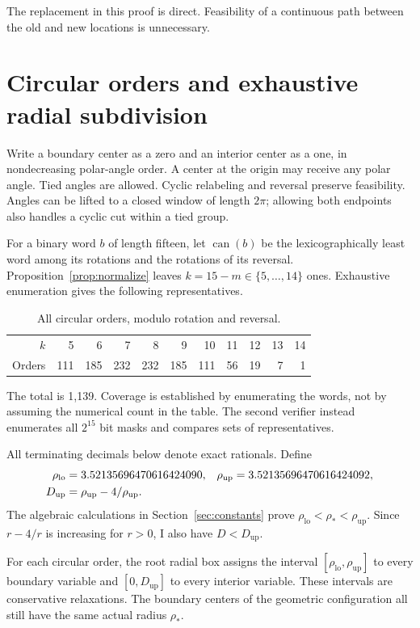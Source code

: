 \documentclass[11pt]{amsart}
\theoremstyle{definition}
\theoremstyle{remark}
\numberwithin{equation}{section}
\newcommand{\rhoopt}{\rho_*}
\newcommand{\rhol}{\rho_{\mathrm{lo}}}
\newcommand{\rhou}{\rho_{\mathrm{up}}}
\begin{document}
The replacement in this proof is direct. Feasibility of a continuous path
between the old and new locations is unnecessary.

\section{Circular orders and exhaustive radial subdivision}

Write a boundary center as a zero and an interior center as a one, in
nondecreasing polar-angle order. A center at the origin may receive any
polar angle. Tied angles are allowed. Cyclic relabeling and reversal preserve
feasibility. Angles can be lifted to a closed window of length $2\pi$;
allowing both endpoints also handles a cyclic cut within a tied group.

For a binary word $b$ of length fifteen, let $\operatorname{can}(b)$ be the
lexicographically least word among its rotations and the rotations of its
reversal. Proposition~\ref{prop:normalize} leaves $k=15-m\in\{5,\ldots,14\}$
ones. Exhaustive enumeration gives the following representatives.
\begin{table}[ht]
\centering
\caption{All circular orders, modulo rotation and reversal.}
\begin{tabular}{@{}rrrrrrrrrrr@{}}
\toprule
$k$&5&6&7&8&9&10&11&12&13&14\\
Orders&111&185&232&232&185&111&56&19&7&1\\
\bottomrule
\end{tabular}
\label{tab:orders}
\end{table}
The total is 1,139. Coverage is established by enumerating the words, not
by assuming the numerical count in the table. The second verifier instead
enumerates all $2^{15}$ bit masks and compares sets of representatives.

All terminating decimals below denote exact rationals. Define
\begin{align}\label{eq:intervals}
 \rhol&=3.52135696470616424090,&
 \rhou&=3.52135696470616424092,\\
 D_{\mathrm{up}}&=\rhou-4/\rhou.\notag
\end{align}
The algebraic calculations in Section~\ref{sec:constants} prove
$\rhol<\rhoopt<\rhou$. Since $r-4/r$ is increasing for $r>0$, I also
have $D<D_{\mathrm{up}}$.

For each circular order, the root radial box assigns the interval
$[\rhol,\rhou]$ to every boundary variable and $[0,D_{\mathrm{up}}]$ to
every interior variable. These intervals are conservative relaxations.
The boundary centers of the geometric configuration all still have the
same actual radius $\rhoopt$.
\end{document}
